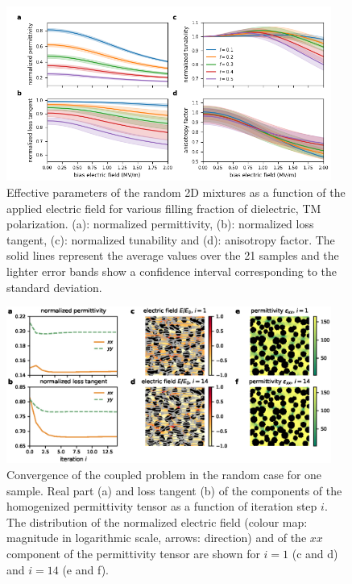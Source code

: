 \documentclass[%
 reprint,
 amsmath,amssymb,
 aps,
]{revtex4-2}
\begin{document}
\begin{figure}[!t]
\centering
\includegraphics[width=0.95\textwidth]{effpar_rand_cpl}
\caption{Effective parameters of the random 2D mixtures as a function of the
 applied electric field for various filling fraction of dielectric, TM polarization.
 (a): normalized permittivity, (b): normalized loss tangent, (c): normalized tunability and
 (d): anisotropy factor. The solid lines represent the average values
  over the 21 samples and the lighter error bands show a confidence interval corresponding to
  the standard deviation.}
\label{eff_par_2Drand_TM}
\end{figure}
%
%
%
\begin{figure}[!t]
\centering
\includegraphics[width=0.95\textwidth]{conv_rand}
\caption{Convergence of the coupled problem in the random case
for one sample.
Real part (a) and loss tangent (b) of the components of the homogenized
 permittivity tensor as a function of iteration step $i$. The distribution of
 the normalized electric field (colour map: magnitude in logarithmic scale, arrows: direction) and of the
 $xx$ component of the permittivity tensor are shown for $i=1$
  (c and d) and $i=14$ (e and f).
 }
\label{conv_random}
\end{figure}
\end{document}
